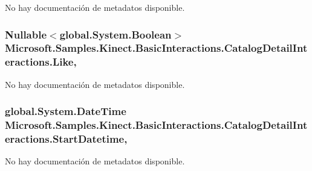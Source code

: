 No hay documentación de metadatos disponible. 

\hypertarget{class_microsoft_1_1_samples_1_1_kinect_1_1_basic_interactions_1_1_catalog_detail_interactions_a4809093c70a9ec7de2e233de9c4b59c0}{
\subsubsection[{Like}]{\setlength{\rightskip}{0pt plus 5cm}Nullable$<$global.\-System.\-Boolean$>$ Microsoft.\-Samples.\-Kinect.\-Basic\-Interactions.\-Catalog\-Detail\-Interactions.\-Like\hspace{0.3cm}{\ttfamily [get]}, {\ttfamily [set]}}}\label{class_microsoft_1_1_samples_1_1_kinect_1_1_basic_interactions_1_1_catalog_detail_interactions_a4809093c70a9ec7de2e233de9c4b59c0}


No hay documentación de metadatos disponible. 

\hypertarget{class_microsoft_1_1_samples_1_1_kinect_1_1_basic_interactions_1_1_catalog_detail_interactions_ae337a5d2ce0ab0d94eacfd8930ba40c9}{
\subsubsection[{Start\-Datetime}]{\setlength{\rightskip}{0pt plus 5cm}global.\-System.\-Date\-Time Microsoft.\-Samples.\-Kinect.\-Basic\-Interactions.\-Catalog\-Detail\-Interactions.\-Start\-Datetime\hspace{0.3cm}{\ttfamily [get]}, {\ttfamily [set]}}}\label{class_microsoft_1_1_samples_1_1_kinect_1_1_basic_interactions_1_1_catalog_detail_interactions_ae337a5d2ce0ab0d94eacfd8930ba40c9}


No hay documentación de metadatos disponible. 

